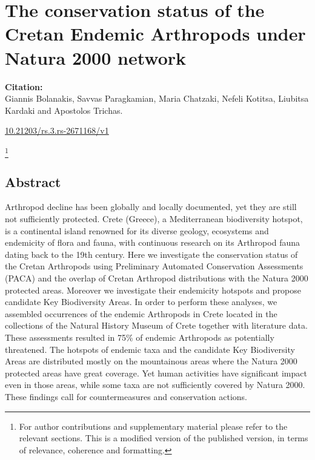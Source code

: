 % 
% 


\chapter{The conservation status of the Cretan Endemic Arthropods under Natura 2000 network}
\label{cha:arthropods}


\textbf{Citation:} \\ 
Giannis Bolanakis, Savvas Paragkamian, Maria Chatzaki, Nefeli Kotitsa, Liubitsa Kardaki and Apostolos Trichas. 

\href{https://doi.org/10.21203/rs.3.rs-2671168/v1}{10.21203/rs.3.rs-2671168/v1}

\footnote{
   For author contributions and supplementary material please refer to the relevant sections. 
   This is a modified version of the published version,
   in terms of relevance, coherence and formatting.
   }



\section{Abstract}

Arthropod decline has been globally and locally documented, yet they are still
not sufficiently protected. Crete (Greece), a Mediterranean biodiversity
hotspot, is a continental island renowned for its diverse geology, ecosystems
and endemicity of flora and fauna, with continuous research on its Arthropod
fauna dating back to the 19th century. Here we investigate the conservation
status of the Cretan Arthropods using Preliminary Automated Conservation
Assessments (PACA) and the overlap of Cretan Arthropod distributions with the
Natura 2000 protected areas. Moreover we investigate their endemicity hotspots
and propose candidate Key Biodiversity Areas. In order to perform these
analyses, we assembled occurrences of the endemic Arthropods in Crete located
in the collections of the Natural History Museum of Crete together with
literature data. These assessments resulted in 75\% of endemic Arthropods as
potentially threatened. The hotspots of endemic taxa and the candidate Key
Biodiversity Areas are distributed mostly on the mountainous areas where the
Natura 2000 protected areas have great coverage. Yet human activities have
significant impact even in those areas, while some taxa are not sufficiently
covered by Natura 2000. These findings call for countermeasures and conservation actions.


